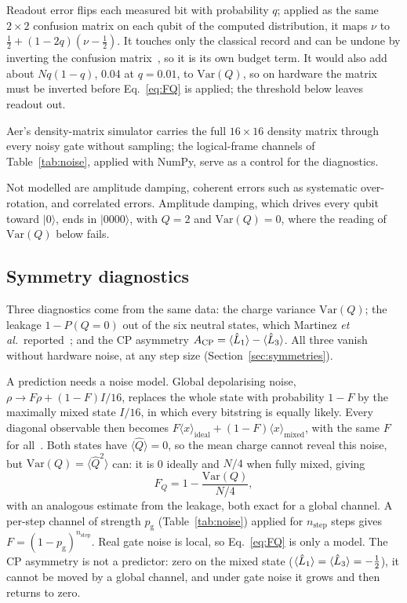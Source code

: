 Readout error flips each measured bit with probability $q$; applied as the
same $2\times 2$ confusion matrix on each qubit of the computed distribution,
it maps $\nu$ to $\tfrac12 + (1-2q)(\nu - \tfrac12)$. It touches only the
classical record and can be undone by inverting the confusion
matrix~\cite{bravyi2021}, so it is its own budget term. It would also add about
$Nq(1-q)$, 0.04 at $q = 0.01$, to $\mathrm{Var}(Q)$, so on hardware the matrix
must be inverted before Eq.~\eqref{eq:FQ} is applied; the threshold below
leaves readout out.

Aer's density-matrix simulator carries the full $16\times 16$ density matrix
through every noisy gate without sampling; the logical-frame channels of
Table~\ref{tab:noise}, applied with NumPy, serve as a control for the
diagnostics.

Not modelled are amplitude damping, coherent errors such as systematic
over-rotation, and correlated errors. Amplitude damping, which drives every
qubit toward $|0\rangle$, ends in $|0000\rangle$, with $Q = 2$ and
$\mathrm{Var}(Q) = 0$, where the reading of $\mathrm{Var}(Q)$ below fails.

\subsection{Symmetry diagnostics}
\label{sec:diagnostics}

Three diagnostics come from the same data: the charge variance
$\mathrm{Var}(Q)$; the leakage $1 - P(Q = 0)$ out of the six neutral states,
which Martinez \emph{et al.}\ reported~\cite{martinez2016}; and the CP
asymmetry $A_{\mathrm{CP}} = \langle\hat{L}_{1}\rangle - \langle\hat{L}_{3}\rangle$.
All three vanish without hardware noise, at any step size
(Section~\ref{sec:symmetries}).

A prediction needs a noise model. Global depolarising noise,
$\rho \to F\rho + (1-F)I/16$, replaces the whole state with probability $1-F$
by the maximally mixed state $I/16$, in which every bitstring is equally
likely. Every diagonal observable then becomes
$F\langle x\rangle_{\mathrm{ideal}} + (1-F)\langle x\rangle_{\mathrm{mixed}}$,
with the same $F$ for all~\cite{vovrosh2021,urbanek2021}.
Both states have $\langle\hat Q\rangle = 0$, so the mean charge cannot reveal
this noise, but $\mathrm{Var}(Q) = \langle\hat Q^2\rangle$ can: it is 0 ideally
and $N/4$ when fully mixed, giving
\begin{equation}
  \label{eq:FQ}
  F_Q = 1 - \frac{\mathrm{Var}(Q)}{N/4},
\end{equation}
with an analogous estimate from the leakage, both exact for a global channel.
A per-step channel of strength $p_{\mathrm{g}}$ (Table~\ref{tab:noise})
applied for $n_{\mathrm{step}}$ steps gives $F = (1-p_{\mathrm{g}})^{n_{\mathrm{step}}}$.
Real gate noise is local, so Eq.~\eqref{eq:FQ} is only a model. The CP
asymmetry is not a predictor: zero on the mixed state
($\langle\hat{L}_{1}\rangle = \langle\hat{L}_{3}\rangle = -\tfrac12$), it cannot be
moved by a global channel, and under gate noise it grows and then returns to
zero.

